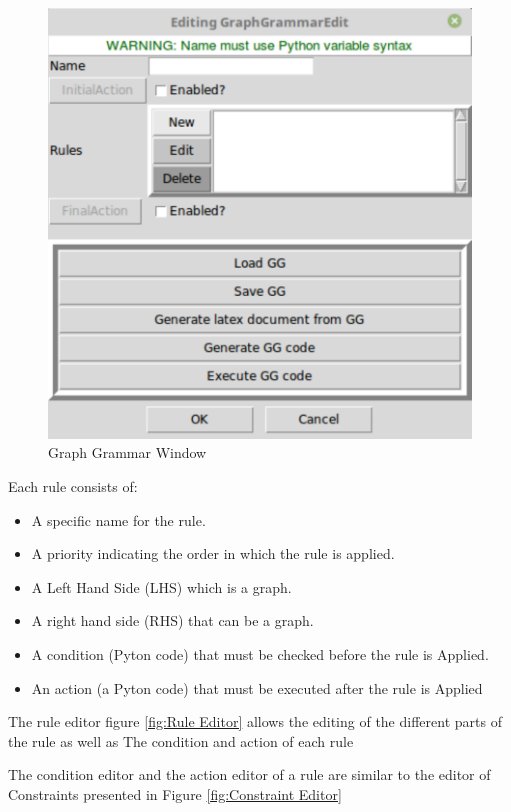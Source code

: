 \begin{figure}[th]
	\centering 
	\includegraphics[scale=0.5]{Chapiter3/img/gg}
	\caption{\label{fig:Graph Grammar Window}Graph Grammar Window}
\end{figure} 
 

 Each rule consists of: 
\begin{itemize}
\item  A specific name for the rule.
\item  A priority indicating the order in which the rule is applied.
\item  A Left Hand Side (LHS) which is a graph.
\item  A right hand side (RHS) that can be a graph.
\item  A condition (Pyton code) that must be checked before the rule is
Applied.
\item An action (a Pyton code) that must be executed after the rule is
Applied
\end{itemize}


The rule editor figure \ref{fig:Rule Editor} allows the editing of the different parts of the rule as well as
The condition and action of each rule 
 
 The condition editor and the action editor of a rule are similar to the editor of
Constraints presented in Figure \ref{fig:Constraint Editor}


